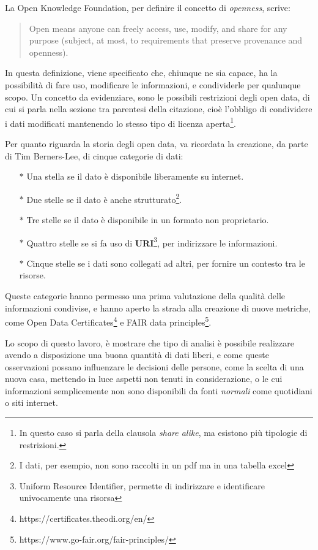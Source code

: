 \documentclass[a4paper,12pt]{report}
\newcommand{\quotestyle}[1]{\textit{#1}}
\newcommand{\skipline}{\vspace{0.2in}}
\begin{document}
La Open Knowledge Foundation, per definire il concetto di \quotestyle{openness}, 
scrive: 

\begin{quotation}
    Open means anyone can freely access, use, modify, and share for any purpose 
    (subject, at most, to requirements that preserve provenance and openness). \cite{OPENDEFINITION:1}
\end{quotation}

In questa definizione, viene specificato che, chiunque ne sia capace, ha la possibilità di 
fare uso, modificare le informazioni, e condividerle per qualunque scopo. 
Un concetto da evidenziare, sono le possibili restrizioni degli open data, 
di cui si parla nella sezione tra parentesi della citazione, 
cioè l'obbligo di condividere i dati modificati 
mantenendo lo stesso tipo di licenza 
aperta\footnote{In questo caso si parla della clausola \quotestyle{share alike}, ma 
esistono più tipologie di restrizioni.}. 

Per quanto riguarda la storia degli open data, va ricordata la creazione, da parte di 
Tim Berners-Lee, di cinque categorie di dati: 

\begin{itemize}
    \item[$\ast$] Una stella se il dato è disponibile liberamente su internet. 
    \item[$\ast$] Due stelle se il dato è anche strutturato\footnote{I dati, 
    per esempio, non sono raccolti in un pdf ma in una tabella excel}. 
    \item[$\ast$] Tre stelle se il dato è disponibile in un formato non proprietario. 
    \item[$\ast$] Quattro stelle se si fa uso 
    di \textbf{URI}\footnote{Uniform Resource Identifier, permette di indirizzare e 
    identificare univocamente una risorsa}, per indirizzare le informazioni. 
    \item[$\ast$] Cinque stelle se i dati sono collegati ad altri, 
    per fornire un contesto tra le risorse. 
\end{itemize}

Queste categorie hanno permesso una prima valutazione della qualità delle informazioni condivise, 
e hanno aperto la strada alla creazione di nuove metriche, come 
Open Data Certificates\footnote{https://certificates.theodi.org/en/} e FAIR data 
principles\footnote{https://www.go-fair.org/fair-principles/}. 

\skipline
Lo scopo di questo lavoro, è mostrare che tipo di analisi è possibile realizzare 
avendo a disposizione una buona quantità di dati liberi, e come queste osservazioni possano 
influenzare le decisioni delle persone, come la scelta di una nuova casa, 
mettendo in luce aspetti non tenuti in considerazione, o le cui informazioni semplicemente 
non sono disponibili da fonti \quotestyle{normali} come quotidiani o siti internet. 
\end{document}
